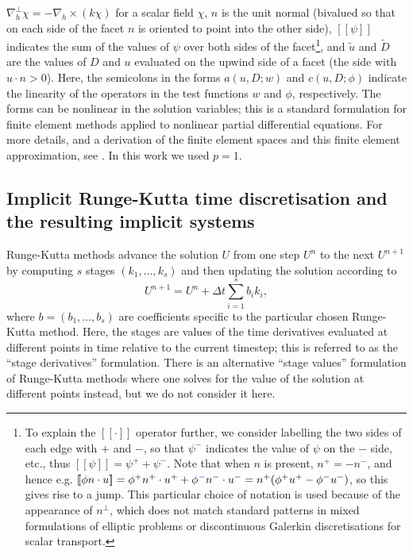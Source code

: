 \documentclass[a4paper, 12pt]{article}
\newcommand{\revisedA}[1]{#1}
\newcommand{\revisedB}[1]{#1}
\newcommand{\revisedC}[1]{{\color{blue}#1}}
\newcommand{\jump}[1]{[\![#1]\!]}
\begin{document}
\revisedC{$\nabla_h^\perp \chi = -\nabla_h \times (k\chi)$ for a scalar field $\chi$,
$n$ is the unit normal (bivalued so that on each side of the facet $n$ is oriented to point
into the other side),
$\jump{\psi}$ indicates the sum of the
values of $\psi$ over both sides of the facet\footnote{\revisedA{To
  explain the $\jump{\cdot}$ operator further, we consider labelling
  the two sides of each edge with $+$ and $-$, so that $\psi^-$
  indicates the value of $\psi$ on the $-$ side, etc., thus
  $\jump{\psi}=\psi^++\psi^-$. Note that when $n$ is present,
  $n^+=-n^-$, and hence e.g. $\jump{\phi n \cdot u}=\phi^+n^+\cdot u^+
  + \phi^\revisedC{-}n^-\cdot u^- = n^+(\phi^+u^+ - \phi^-u^-)$, so this gives
  rise to a jump. This particular choice of notation is used because
  of the appearance of $n^\perp$, which does not match standard
  patterns in mixed formulations of elliptic problems or discontinuous
  Galerkin discretisations for scalar transport.}}, and
$\tilde{u}$ and
$\tilde{D}$ are the values of $D$ and $u$ evaluated on the upwind side
of a facet (the side with $u\cdot n > 0$).} \revisedB{Here, the
  semicolons in the forms $a(u,D;w)$ and $c(u,D;\phi)$ indicate the
  linearity of the operators in the test functions $w$ and $\phi$,
  respectively. The forms can be nonlinear in the solution variables;
  this is a standard formulation for finite element methods applied
  to nonlinear partial differential equations.}
For more details, and a
derivation of the finite element spaces and this finite element
approximation, see \cite{gibson2019compatible}. In this work we used
$p=1$.

\subsection{Implicit Runge-Kutta time discretisation
  \revisedA{and the resulting implicit systems}}

Runge-Kutta methods advance the solution $U$ from one step $U^n$ to
the next $U^{n+1}$ by computing $s$ stages $(k_1,\ldots,k_s)$ and then
updating the solution according to
\begin{equation}
  U^{n+1} = U^n + \Delta t\sum_{i=1}^s b_i k_i,
\end{equation}
where $b=(b_1,\ldots, b_s)$ are coefficients specific to the
particular chosen Runge-Kutta method. \revisedB{Here, the stages are
  values of the time derivatives evaluated at different points in time
  relative to the current timestep; this is referred to as the ``stage
  derivatives'' formulation. There is an alternative ``stage values''
  formulation of Runge-Kutta methods where one solves for the value
  of the solution at different points instead, but we do not consider
  it here.}
\end{document}

